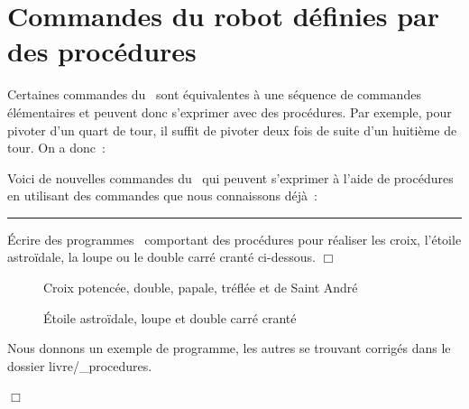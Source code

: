 \section{Commandes du robot définies par des procédures} 

Certaines commandes du \robot\ sont équivalentes à une séquence
de commandes élémentaires et peuvent donc s'exprimer avec des procédures.
Par exemple, pour pivoter d'un quart de tour, il suffit de pivoter deux fois
de suite d'un huitième de tour. On a donc~:

\noindent Voici de nouvelles commandes du \robot\ qui peuvent s'exprimer à l'aide de
procédures en utilisant des commandes que nous connaissons déjà~:

\noindent\rule{137mm}{0.1mm} %
\begin{exercices}{
Écrire des programmes \ocaml\ comportant des pro\-cé\-du\-res pour 
réaliser les croix,
l'étoile astroïdale, la loupe ou le double carré cranté
ci-dessous.
\noindent $\Box$}\end{exercices}
\begin{figure}[htbp]
 \vspace{-\baselineskip}
 \caption{Croix potencée, double, papale, tréflée et de Saint André}
\end{figure}
\begin{figure}[htbp]
 \caption{Étoile astroïdale, loupe et double carré cranté}
\end{figure}

\clearpage

\begin{corrige}{
Nous donnons un exemple de programme, les
autres se trouvant corrigés dans le dossier {\idt livre/\_procedures}.

\noindent $\Box$}\end{corrige}

\vfill

